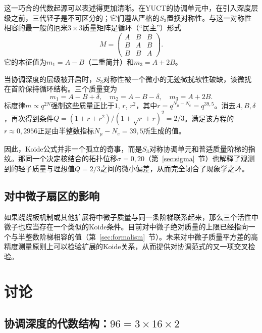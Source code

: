 \documentclass[11pt,a4paper]{article}
\begin{document}
这一巧合的代数起源可以表述得更加清晰。在YUCT的协调单元中，在引入深度层级之前，三代轻子是不可区分的；它们遵从严格的$S_3$置换对称性。与这一对称性相容的最一般的厄米$3\times3$质量矩阵是循环（“民主”）形式
\begin{equation}
	M = \begin{pmatrix}
		A & B & B \\
		B & A & B \\
		B & B & A
	\end{pmatrix}.
	\label{eq:democratic}
\end{equation}
它的本征值为$m_1 = A - B$（二重简并）和$m_3 = A + 2B$。

当协调深度的层级被开启时，$S_3$对称性被一个微小的无迹微扰软性破缺，该微扰在首阶保持循环结构。三个质量变为
\begin{equation}
	m_1 = A - B + \delta,\quad
	m_2 = A - B - \delta,\quad
	m_3 = A + 2B.
\end{equation}
标度律$m \propto q^{2N}$强制这些质量正比于$1$, $r$, $r^2$，其中$r = q^{N_\mu - N_e} = q^{39{,}5}$。消去$A,B,\delta$，再次得到条件$Q = (1+r+r^2)/(1+\sqrt{r}+r)^2 = 2/3$。满足该方程的$r \approx 0{,}2956$正是由半整数指标$N_\mu - N_e = 39{,}5$所生成的值。

因此，Koide公式并非一个孤立的奇事，而是$S_3$对称协调单元和普适质量阶梯的指纹。那同一个决定核结合的拓扑位移$\sigma = 0{,}20$（第~\ref{sec:sigma}~节）也解释了观测到的轻子质量与理想值$Q = 2/3$之间的微小偏差，从而完全闭合了现象学之环。

\subsection{对中微子扇区的影响}

如果跷跷板机制或其他扩展将中微子质量与同一条阶梯联系起来，那么三个活性中微子也应当存在一个类似的Koide条件。目前对中微子绝对质量的上限已经指向一个与半整数阶梯相容的值（第~\ref{sec:formalism}~节）。未来对中微子质量平方差的高精度测量原则上可以检验扩展的Koide关系，从而提供对协调范式的又一项交叉检验。

	\section{讨论}
	\label{sec:discussion}
	
	\subsection{协调深度的代数结构：\(96 = 3 \times 16 \times 2\)}
	
\end{document}
